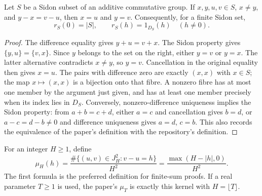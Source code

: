 \begin{lemma}
\leanok
\label{core:difference-uniqueness}
Let $S$ be a Sidon subset of an additive commutative group.  If
$x,y,u,v\in S$, $x\ne y$, and $y-x=v-u$, then $x=u$ and $y=v$.
Consequently, for a finite Sidon set,
\[
 r_S(0)=|S|,\qquad
 r_S(h)=1_{D_S}(h)\quad(h\ne0).
\]
\end{lemma}
\begin{proof}
The difference equality gives $y+u=v+x$.  The Sidon property gives
$\{y,u\}=\{v,x\}$.  Since $y$ belongs to the set on the right, either
$y=v$ or $y=x$.  The latter alternative contradicts $x\ne y$, so
$y=v$.  Cancellation in the original equality then gives $x=u$.
The pairs with difference zero are exactly $(x,x)$ with $x\in S$;
the map $x\mapsto(x,x)$ is a bijection onto that fibre.  A nonzero
fibre has at most one member by the argument just given, and has at
least one member precisely when its index lies in $D_S$.
Conversely, nonzero-difference uniqueness implies the Sidon property:
from $a+b=c+d$, either $a=c$ and cancellation gives $b=d$, or
$a-c=d-b\ne0$ and difference uniqueness gives $a=d$, $c=b$.
This also records the equivalence of the paper's definition with the
repository's definition.
\end{proof}

\begin{definition}
\leanok
\label{core:fejer-definition}
For an integer $H\geq1$, define
\[
 \mu_H(h)=\frac{\#\{(u,v)\in J_H^2:v-u=h\}}{H^2}
          =\frac{\max(H-|h|,0)}{H^2}.
\]
The first formula is the preferred definition for finite-sum proofs.
If a real parameter $T\geq1$ is used, the paper's $\mu_T$ is exactly
this kernel with $H=\lfloor T\rfloor$.
\end{definition}

